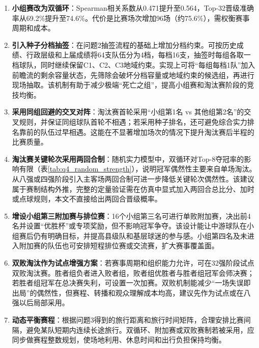 \documentclass[12pt,a4paper]{article}
\begin{document}
{\renewcommand{\labelenumi}{\textbf{建议\arabic{enumi}：}}
  \begin{enumerate}

    \item \textbf{小组赛改为双循环}：Spearman相关系数从0.471提升至0.564，Top-32晋级准确率从69.2\%提升至74.6\%。代价是比赛场次增加96场（约75.6\%），需权衡赛事周期和成本。

    \item \textbf{引入种子分档抽签}：在问题2抽签流程的基础上增加分档约束。可按历史成绩、行政层级和上届成绩将64支队伍分为4档，每档16支，抽签时每组各取一档球队，同时继续保留C1、C2、C3地域约束。实现上可将“每组每档1队”加入前瞻流的剩余容量状态，先筛除会破坏分档容量或地域约束的候选组，再进行现场抽取。该机制有助于减少极端“死亡之组”，提高小组赛和淘汰赛阶段的竞技均衡。

    \item \textbf{采用同组回避的交叉对阵}：淘汰赛首轮采用“小组第1名 vs 其他组第2名”的交叉规则，并保证同组球队首轮不相遇；若采用种子排名，还可避免综合实力排名靠前的队伍过早相遇。这能在不显著增加场次的情况下提升淘汰赛后半程的比赛质量。

    \item \textbf{淘汰赛关键轮次采用两回合制}：随机实力模型中，双循环对Top-8夺冠率的影响有限（表\ref{tab:q4_random_strength}），说明冠军偶然性主要来自单场淘汰。从八强或四强阶段引入主客场两回合制可进一步降低关键轮次偶然性。该建议属于赛制结构外推，完整的定量验证需在仿真中显式加入两回合总比分、加时或点球规则，本文不直接给出两回合晋级概率。

    \item \textbf{增设小组第三附加赛与排位赛}：16个小组第三名可进行单败附加赛，决出前4名并设置“优胜杯”或专项奖励，但不影响冠军争夺。该设计能让中游球队在小组赛后仍有明确目标，并提高县级队和基层球迷的参与感。小组第四名及未进入附加赛的队伍也可安排短程排位赛或交流赛，扩大赛事覆盖面。

    \item \textbf{双败淘汰作为试点增强方案}：若赛事周期和组织能力允许，可在32强阶段试点双败淘汰赛。胜者组负者进入败者组，败者组优胜者与胜者组冠军会师决赛；若胜者组冠军在总决赛失利，可设置一次加赛。双败机制能减少“一场失误即出局”的偶然性，但赛程、转播和观众理解成本均高，建议先作为试点或在八强以后局部采用。

    \item \textbf{动态平衡赛程}：根据问题3得到的旅行距离和旅行时间矩阵，合理安排比赛间隔，避免某队短期内连续长途旅行。双循环、附加赛或双败赛制若被采用，应同步做赛程整数规划，使场地利用、休息时间和出行负担保持均衡。

\end{enumerate}}
\end{document}
